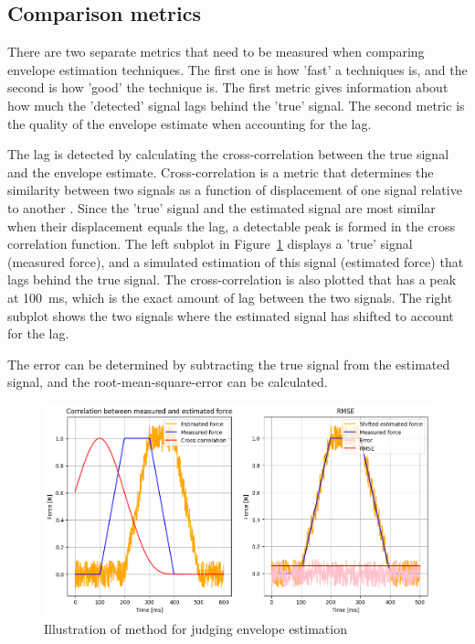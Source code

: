 \subsection{Comparison metrics}
There are two separate metrics that need to be measured when comparing envelope estimation techniques. The first one is how 'fast' a techniques is, and the second is how 'good' the technique is. The first metric gives information about how much the 'detected' signal lags behind the 'true' signal. The second metric is the quality of the envelope estimate when accounting for the lag.

The lag is detected by calculating the cross-correlation between the true signal and the envelope estimate. Cross-correlation is a metric that determines the similarity between two signals as a function of displacement of one signal relative to another \cite{wiki:cross_correlation}. Since the 'true' signal and the estimated signal are most similar when their displacement equals the lag, a detectable peak is formed in the cross correlation function. The left subplot in Figure~\ref{fig:envelope_estimation_method} displays a 'true' signal (measured force), and a simulated estimation of this signal (estimated force) that lags behind the true signal. The cross-correlation is also plotted that has a peak at \SI{100}{\milli\second}, which is the exact amount of lag between the two signals. The right subplot shows the two signals where the estimated signal has shifted to account for the lag. 

The error can be determined by subtracting the true signal from the estimated signal, and the root-mean-square-error can be calculated. 

\begin{figure}[h!t]
	\begin{center}
		\includegraphics[width=1.0\columnwidth]{images/envelope_estimation_method.png}
	\end{center}
	\caption{Illustration of method for judging envelope estimation}
	\label{fig:envelope_estimation_method}
\end{figure}


